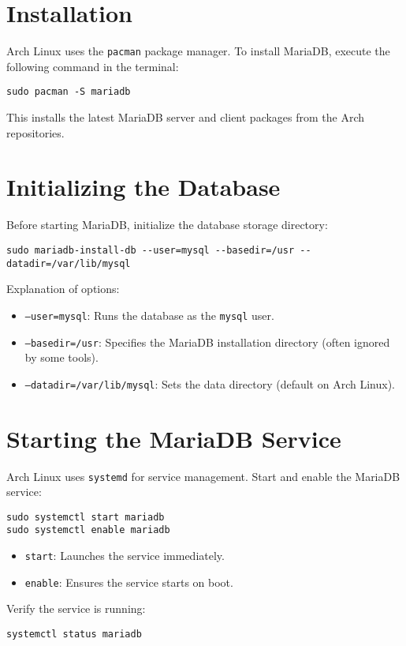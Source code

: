 \documentclass[10pt]{article}
\begin{document}
\section{Installation}
Arch Linux uses the \texttt{pacman} package manager. To install MariaDB, execute the following command in the terminal:
\begin{lstlisting}
sudo pacman -S mariadb
\end{lstlisting}
This installs the latest MariaDB server and client packages from the Arch repositories.

\section{Initializing the Database}
Before starting MariaDB, initialize the database storage directory:
\begin{lstlisting}
sudo mariadb-install-db --user=mysql --basedir=/usr --datadir=/var/lib/mysql
\end{lstlisting}
Explanation of options:
\begin{itemize}
    \item \texttt{--user=mysql}: Runs the database as the \texttt{mysql} user.
    \item \texttt{--basedir=/usr}: Specifies the MariaDB installation directory (often ignored by some tools).
    \item \texttt{--datadir=/var/lib/mysql}: Sets the data directory (default on Arch Linux).
\end{itemize}

\section{Starting the MariaDB Service}
Arch Linux uses \texttt{systemd} for service management. Start and enable the MariaDB service:
\begin{lstlisting}
sudo systemctl start mariadb
sudo systemctl enable mariadb
\end{lstlisting}
\begin{itemize}
    \item \texttt{start}: Launches the service immediately.
    \item \texttt{enable}: Ensures the service starts on boot.
\end{itemize}
Verify the service is running:
\begin{lstlisting}
systemctl status mariadb
\end{lstlisting}
\end{document}
